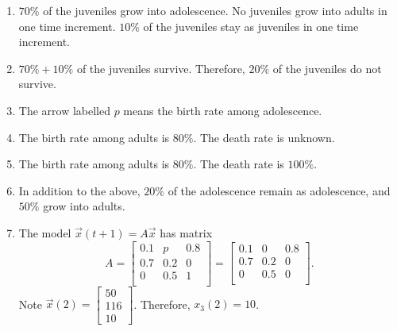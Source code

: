 \documentclass[../main.tex]{subfiles}
\begin{document}
\begin{exercise}
  \begin{solution} \phantom{top}

    \begin{enumerate}
      \item \(70\%\) of the juveniles grow into adolescence. No juveniles grow into adults in one time increment. \(10\%\) of the juveniles stay as juveniles in one time increment.
      \item \(70\% + 10\%\) of the juveniles survive. Therefore, \(20\%\) of the juveniles do not survive.
      \item The arrow labelled \(p\) means the birth rate among adolescence.
      \item The birth rate among adults is \(80\%\). The death rate is unknown.
      \item The birth rate among adults is \(80\%\). The death rate is \(100\%\).
      \item In addition to the above, \(20\%\) of the adolescence remain as adolescence, and \(50\%\) grow into adults.
      \item The model \(\vec{x}(t+1) = A\vec{x}\) has matrix 
        \[
          A = 
          \begin{bmatrix}
            0.1 &   p & 0.8 \\
            0.7 & 0.2 & 0   \\
            0   & 0.5 & 1   \\
          \end{bmatrix}
          =
          \begin{bmatrix}
            0.1 & 0   & 0.8 \\
            0.7 & 0.2 & 0   \\
            0   & 0.5 & 0   \\
          \end{bmatrix}.
        \]
        Note 
        \(
          \vec{x}(2) = 
          \begin{bmatrix}
            50 \\
            116 \\
            10
          \end{bmatrix}
        \). Therefore, \(x_{3}(2) = 10\).

    \end{enumerate}
  \end{solution}
\end{exercise}
\end{document}
